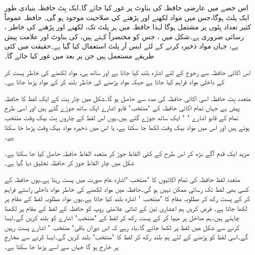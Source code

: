 اس حصے  میں عارضی حافظہ کی بناوٹ پر غور کیا جائے گا۔ایک بِٹ حافظہ بنیادی طور   ایک پلٹ ہوگا،جس میں مواد لکھنے اور پڑھنے کی صلاحیت موجود ہو گی۔ حافظہ عموماً کثیر تعداد بِٹوں پر مشتمل ہوگا لہٰذا حافظہ میں ہر پلٹ  تک، لکھنے اور پڑھنے کی خاطر ،  رسائی ضروری ہے۔شکل میں ، جس کو مختصراً کہتے ہیں، کی بناوٹ اور علامت  پیش ہے، جہاں مواد ذخیرہ کرنے کے لئے ایس آر  پلٹ استعمال کیا گیا ہے۔حقیقت میں کئی طریقے مستعمل ہیں جن  پر  بعد میں غور کیا جائے گا۔ 


اس اکائی حافظہ سے رجوع کے لئے     اشارہ بلند کیا جاتا ہے اور ساتھ ہی،     مواد لکھنے کی خاطر  پست کر کے  داخلی مواد فراہم کیا جاتا ہے جبکہ  مواد پڑھنے کی خاطر    بلند کر کے مواد پڑھا جاتا ہے۔

متعدد  بِٹ حافظہ اسی اکائی حافظہ کی مدد سے حاصل  ہو گا۔شکل  میں چار بِٹ کے ایک لفظ کا حافظہ  پیش ہے جہاں تمام اکائی حافظہ کے   "منتخب" قابو اشارے ایک ساتھ جوڑے گئے ہیں اور اسی طرح تمام کے قابو  اشارے   "  " ایک ساتھ جوڑے گئے ہیں۔یوں اس لفظ کے چاروں بِٹ بیک وقت منتخب ہوتے ہیں اور اس میں مواد   بیک وقت لکھا جا سکتا ہے،  یا اس میں ذخیرہ مواد بیک وقت پڑھا جا سکتا ہے۔

مزید ایک قدم   آگے بڑھ کر اس طرح کے کئی الفاظ جوڑ کر  متعدد الفاظ حافظہ حاصل  کیا جا سکتا ہے۔شکل  میں چار الفاظ جوڑ کر حافظہ  تخلیق دیا گیا ہے۔

متعدد لفظ حافظہ  کی تمام  اکائیوں   کا "منتخب "اشارہ عام صورت میں  پست رہتا ہے۔یوں حافظہ کے  کسی بھی لفظ  تک رسائی  ممکن  نہیں ہو گی۔حافظہ میں مواد لکھنے کی خاطر مواد   داخلی راستے فراہم کر کے   پست رکھ کر  مطلوبہ مقام کا  "منتخب " اشارہ بلند کیا جاتا ہے۔یوں مواد مطلوبہ لفظ کے مقام پر لکھا جاتا ہے۔ فرض کریں ہم  اعشاری تین   کے  ثنائی علامتی روپ    کو حافظہ کے لفظ  کے مقام پر لکھنا چاہتے ہیں۔ہم مداخل پر  مہیا کر کے     پست   رکھ کر لفظ   کے  "منتخب" اشارے کو بلند   کریں گے۔ایسا کرنے سے شکل   میں لفظ   پر   لکھا  جائے گا۔یاد رہے کہ اس دوران باقی" منتخب " اشارے پست رہیں گے۔اسی لفظ کو پڑھنے کے لئے  ہم     بلند رکھ کر لفظ   کا  "منتخب"  بلند کریں گے۔ایسا کرنے سے مخارج   پر   خارج ہو گا  جہاں سے اسے  پڑھا جا سکتا ہے۔



